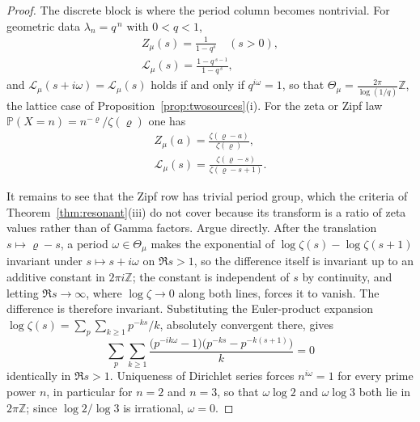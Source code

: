 \documentclass[sn-mathphys-num]{sn-jnl}
\theoremstyle{thmstyleone}%
\theoremstyle{thmstyletwo}%
\theoremstyle{thmstylethree}%
\theoremstyle{thmstyleone}%
\providecommand{\Z}{\mathbb{Z}}
\providecommand{\Prob}{\mathbb{P}}
\providecommand{\Leh}{\mathscr{L}}
\begin{document}
\begin{appendices}
\begin{proof}
			The discrete block is where the period column becomes
			nontrivial. For geometric data $\lambda_n=q^{\,n}$ with
			$0<q<1$,
			\begin{equation}\label{eq:dictGeom}
				\begin{gathered}
					Z_\mu(s)=\frac{1}{1-q^{s}}\quad(s>0),\\
					\Leh_\mu(s)=\frac{1-q^{\,s-1}}{1-q^{\,s}} ,
				\end{gathered}
			\end{equation}
			and $\Leh_\mu(s+i\omega)=\Leh_\mu(s)$ holds if and only if
			$q^{i\omega}=1$, so that
			$\Theta_\mu=\tfrac{2\pi}{\log(1/q)}\Z$, the lattice case of
			Proposition~\ref{prop:twosources}(i). For the zeta or Zipf law
			$\Prob(X=n)=n^{-\varrho}/\zeta(\varrho)$ one has
			\begin{equation}\label{eq:dictZipf}
				\begin{gathered}
					Z_\mu(a)=\frac{\zeta(\varrho-a)}{\zeta(\varrho)},\\
					\Leh_\mu(s)=\frac{\zeta(\varrho-s)}{\zeta(\varrho-s+1)} .
				\end{gathered}
			\end{equation}
			
			It remains to see that the Zipf row has trivial period group,
			which the criteria of Theorem~\ref{thm:resonant}(iii) do not
			cover because its transform is a ratio of zeta values rather
			than of Gamma factors. Argue directly. After the translation
			$s\mapsto\varrho-s$, a period $\omega\in\Theta_\mu$ makes
			the exponential of $\log\zeta(s)-\log\zeta(s+1)$ invariant
			under $s\mapsto s+i\omega$ on $\Re s>1$, so the difference
			itself is invariant up to an additive constant in $2\pi i\Z$;
			the constant is independent of $s$ by continuity, and letting
			$\Re s\to\infty$, where $\log\zeta\to0$ along both lines,
			forces it to vanish. The difference is therefore invariant.
			Substituting the
			Euler-product expansion
			$\log\zeta(s)=\sum_p\sum_{k\ge1}p^{-ks}/k$, absolutely
			convergent there, gives
			\begin{equation}\label{eq:zetaperiod}
				\sum_{p}\sum_{k\ge1}
				\frac{\bigl(p^{-ik\omega}-1\bigr)
					\bigl(p^{-ks}-p^{-k(s+1)}\bigr)}{k}=0
			\end{equation}
			identically in $\Re s>1$. Uniqueness of Dirichlet series
			forces $n^{i\omega}=1$ for every prime power $n$, in
			particular for $n=2$ and $n=3$, so that $\omega\log2$ and
			$\omega\log3$ both lie in $2\pi\Z$; since $\log2/\log3$
			is irrational, $\omega=0$.
		\end{proof}
		

\end{appendices}
\end{document}
